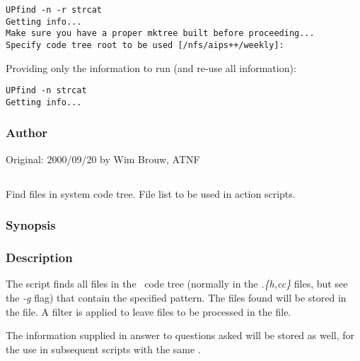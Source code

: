 \begin{verbatim}
UPfind -n -r strcat
Getting info...
Make sure you have a proper mktree built before proceeding...
Specify code tree root to be used [/nfs/aips++/weekly]: 
\end{verbatim}

\noindent
Providing only the information to run (and re-use all information):

\begin{verbatim}
UPfind -n strcat
Getting info...
\end{verbatim}

\subsubsection*{Author}

Original: 2000/09/20 by Wim Brouw, ATNF


\subsection{}
\label{UPfind}

Find files in system code tree. File list to be used in action 
scripts.

\subsubsection*{Synopsis}

\begin{synopsis}
\end{synopsis}

\subsubsection*{Description}

The  script finds all files in the \aipspp\ code tree (normally
in the {\em .\{h,cc\}} files, but see the {\em -g} flag) that contain the
specified pattern. The files found will be stored in the  file. A filter is applied to leave files to be processed in the
 file.

\noindent
The information supplied in answer to questions asked will be stored as well,
for the use in subsequent scripts with the same .

